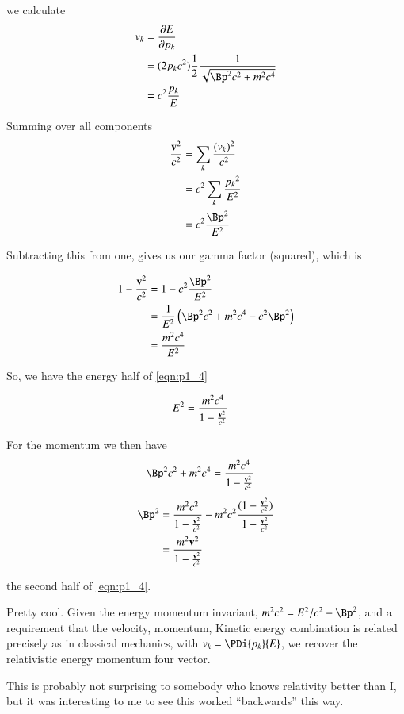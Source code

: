 we calculate
\begin{align*}
v_k 
&= \PD{p_k}{E} \\
&= (2 p_k c^2) \inv{2} \frac{1}{\sqrt{\Bp^2 c^2 + m^2 c^4 }} \\
&= c^2 \frac{p_k}{E}
\end{align*}

Summing over all components
\begin{align*}
\frac{\Bv^2}{c^2} 
&= \sum_k \frac{(v_k)^2}{c^2} \\
&= c^2 \sum_k \frac{{p_k}^2}{E^2} \\
&= c^2 \frac{\Bp^2}{E^2} \\
\end{align*}

Subtracting this from one, gives us our gamma factor (squared), which is

\begin{align*}
1 - \frac{\Bv^2}{c^2} 
&= 1 - c^2 \frac{\Bp^2}{E^2} \\
&= \inv{E^2} \left( \Bp^2 c^2 + m^2 c^4  - c^2 {\Bp^2} \right) \\
&= \frac{m^2 c^4}{E^2} \\
\end{align*}

So, we have the energy half of \ref{eqn:p1_4}

\begin{align*}
E^2 &= \frac{m^2 c^4}{1 - \frac{\mathbf{v}^2}{c^2} }
\end{align*}

For the momentum we then have
\begin{align*}
\Bp^2 c^2 + m^2 c^4 &= \frac{m^2 c^4}{1 - \frac{\Bv^2}{c^2} }
\end{align*}
\begin{align*}
\Bp^2 
&= \frac{m^2 c^2}{1 - \frac{\Bv^2}{c^2} } - m^2 c^2 \frac{(1 - \frac{\Bv^2}{c^2} )}{1 - \frac{\Bv^2}{c^2} } \\
&= \frac{m^2 \Bv^2}{1 - \frac{\Bv^2}{c^2} } 
\end{align*}

the second half of \ref{eqn:p1_4}.

Pretty cool.  Given the energy momentum invariant, $m^2 c^2 = E^2/c^2 - \Bp^2$, and a requirement that the velocity, momentum, Kinetic energy combination is related precisely as in classical mechanics, with $v_k = \PDi{p_k}{E}$, we
recover the relativistic energy momentum four vector.

This is probably not surprising to somebody who knows relativity better than I, but it was
interesting to me to see this worked ``backwards'' this way.

